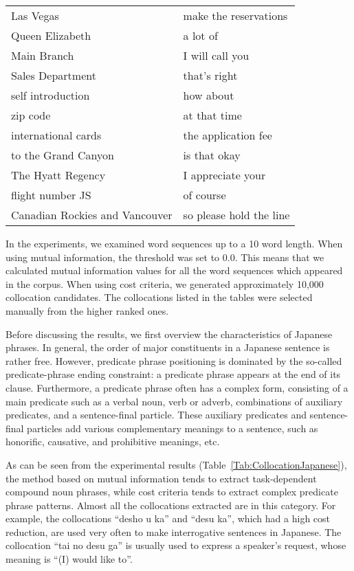 \begin{table}[p]
\begin{center}
\begin{tabular}{p{6.5cm}|p{6.5cm}}
Las Vegas                       &  make the reservations  \\
Queen Elizabeth                 &  a lot of  \\
Main Branch                     &  I will call you  \\
Sales Department                &  that's right  \\
self introduction               &  how about  \\
zip code                        &  at that time  \\
international cards             &  the application fee  \\
to the Grand Canyon             &  is that okay  \\
The Hyatt Regency               &  I appreciate your  \\
flight number JS                &  of course  \\
Canadian Rockies and Vancouver  &  so please hold the line  \\
\hline
\end{tabular}
\end{center}
\end{table}

In the experiments,
we examined word sequences up to a 10 word length.
When using mutual information,
the threshold was set to 0.0.
This means that we calculated mutual information values
for all the word sequences which appeared in the corpus.
When using cost criteria,
we generated approximately 10,000 collocation candidates.
The collocations listed in the tables were selected manually
from the higher ranked ones.

Before discussing the results,
we first overview the characteristics of Japanese phrases.
In general, the order of major constituents in a Japanese sentence is rather free.
However, predicate phrase positioning is dominated by
the so-called predicate-phrase ending constraint:
a predicate phrase appears at the end of its clause.
Furthermore, a predicate phrase often has a complex form,
consisting of a main predicate such as a verbal noun, verb or adverb,
combinations of auxiliary predicates, and a sentence-final particle.
These auxiliary predicates and sentence-final particles
add various complementary meanings to a sentence,
such as honorific, causative,
and prohibitive meanings, etc.

As can be seen from the experimental results
(Table~\ref{Tab:CollocationJapanese}),
the method based on mutual information tends to
extract task-dependent compound noun phrases,
while cost criteria tends to extract complex predicate phrase patterns.
Almost all the collocations extracted are in this category.
For example,
the collocations ``desho u ka'' and ``desu ka'',
which had a high cost reduction,
are used very often to make interrogative sentences in Japanese.
The collocation ``tai no desu ga'' is usually used to
express a speaker's request,
whose meaning is ``(I) would like to''.

